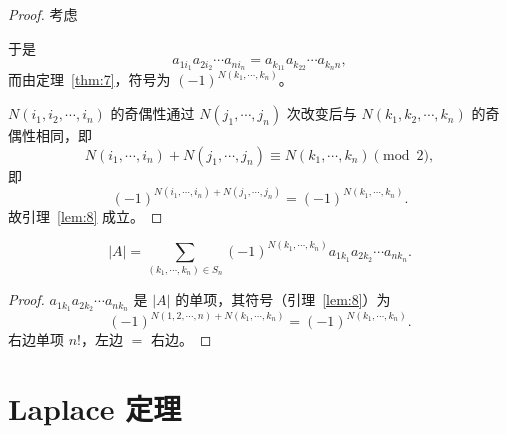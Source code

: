 \begin{proof}
考虑
\begin{center}
\end{center}
于是
\[
a_{1i_1}a_{2i_2}\cdots a_{ni_n}=a_{k_11}a_{k_22}\cdots a_{k_nn},
\]
而由定理~\ref{thm:7}，符号为 $(-1)^{N(k_1,\cdots,k_n)}$。

$N(i_1,i_2,\cdots,i_n)$ 的奇偶性通过 $N(j_1,\cdots,j_n)$ 次改变后与
$N(k_1,k_2,\cdots,k_n)$ 的奇偶性相同，即
\[
N(i_1,\cdots,i_n)+N(j_1,\cdots,j_n)\equiv N(k_1,\cdots,k_n)\pmod 2,
\]
即
\[
(-1)^{N(i_1,\cdots,i_n)+N(j_1,\cdots,j_n)}=(-1)^{N(k_1,\cdots,k_n)}.
\]
故引理~\ref{lem:8} 成立。
\end{proof}

\begin{corollary}
\[
|A|=\sum_{(k_1,\cdots,k_n)\in S_n}
(-1)^{N(k_1,\cdots,k_n)}a_{1k_1}a_{2k_2}\cdots a_{nk_n}.
\]
\end{corollary}

\begin{proof}
$a_{1k_1}a_{2k_2}\cdots a_{nk_n}$ 是 $|A|$ 的单项，其符号（引理~\ref{lem:8}）为
\[
(-1)^{N(1,2,\cdots,n)+N(k_1,\cdots,k_n)}=(-1)^{N(k_1,\cdots,k_n)}.
\]
右边单项 $n!$，左边 $=$ 右边。
\end{proof}

\section{Laplace 定理}


